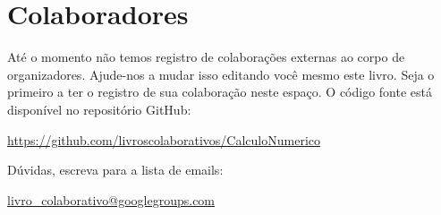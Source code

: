 \documentclass[12pt]{book}
\begin{document}
\shipoutAnswer  
\fi

\nocite{*}




\chapter*{Colaboradores}

Até o momento não temos registro de colaborações externas ao corpo de organizadores. Ajude-nos a mudar isso editando você mesmo este livro. Seja o primeiro a ter o registro de sua colaboração neste espaço. O código fonte está disponível no repositório GitHub:
\begin{center}
  \url{https://github.com/livroscolaborativos/CalculoNumerico}
\end{center}
Dúvidas, escreva para a lista de emails:
\begin{center}
  \url{livro_colaborativo@googlegroups.com}
\end{center}

\ifishtml
\else
\clearpage
{}
\printindex
\fi
\end{document}
